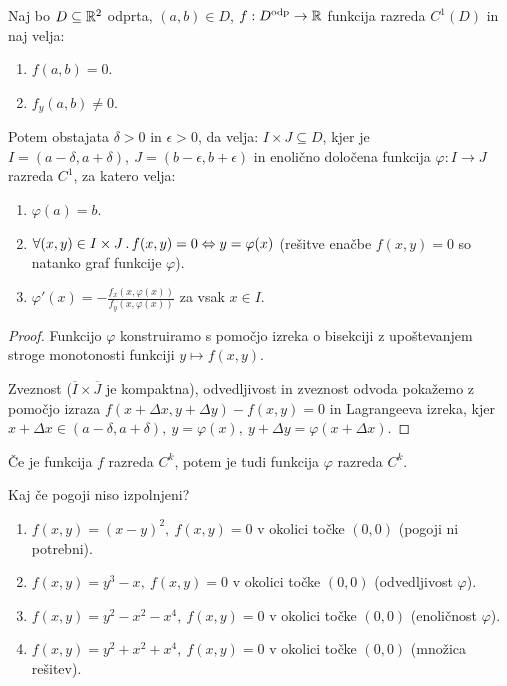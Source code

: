 \begin{izrek}
    Naj bo $D \subseteq \mathbb{R}^2$ odprta,  $(a, b) \in D$,  $f: D^\text{odp} \to \mathbb{R}$ funkcija razreda $ C^1(D)$ in naj velja:
    \begin{enumerate}
        \item $f(a,b) = 0$.
        \item $f_y(a,b) \neq 0$.
    \end{enumerate}
    Potem obstajata $\delta > 0$ in $\epsilon > 0$, da velja: $I \times J \subseteq D$, kjer je $I = (a - \delta, a + \delta), \ J = (b-\epsilon, b+\epsilon)$ in enolično določena funkcija $\varphi: I \to J$ razreda $C^1$, za katero velja:
    \begin{enumerate}
        \item $\varphi(a) = b$.
        \item $\forall (x,y) \in I \times J \,.\, f(x, y) = 0 \Leftrightarrow y = \varphi (x)$ (rešitve enačbe $f(x,y) = 0$ so natanko graf funkcije $\varphi$).
        \item $\varphi'(x) = -\frac{f_x(x, \varphi(x))}{f_y(x, \varphi(x))}$ za vsak $x \in I$.
    \end{enumerate}
\end{izrek}

\begin{proof}
    Funkcijo $\varphi$ konstruiramo s pomočjo izreka o bisekciji z upoštevanjem stroge monotonosti funkciji $y \mapsto f(x, y)$.

    Zveznost ($\overline{I} \times \overline{J}$ je kompaktna), odvedljivost in zveznost odvoda pokažemo z pomočjo izraza $f(x + \Delta x, y + \Delta y) - f(x,y) = 0$ in Lagrangeeva izreka, kjer $x + \Delta x \in (a - \delta, a + \delta), \ y= \varphi (x), \ y + \Delta y = \varphi(x + \Delta x)$.
\end{proof}

\begin{posledica}
    Če je funkcija $f$ razreda $C^k$, potem je tudi funkcija $\varphi$ razreda $C^k$.
\end{posledica}

\begin{zgled}
    Kaj če pogoji niso izpolnjeni?
    \begin{enumerate}
        \item $f(x,y) = (x-y)^2, \ f(x,y) = 0$ v okolici točke $(0,0)$ (pogoji ni potrebni).
        \item $f(x,y) = y^3 - x, \ f(x,y) = 0$ v okolici točke $(0,0)$ (odvedljivost $\varphi$).
        \item $f(x,y) = y^2-x^2-x^4, \ f(x,y) = 0$ v okolici točke $(0,0)$ (enoličnost $\varphi$).
        \item $f(x,y) = y^2+x^2+x^4, \ f(x,y) = 0$ v okolici točke $(0,0)$ (množica rešitev).
    \end{enumerate}
\end{zgled}

